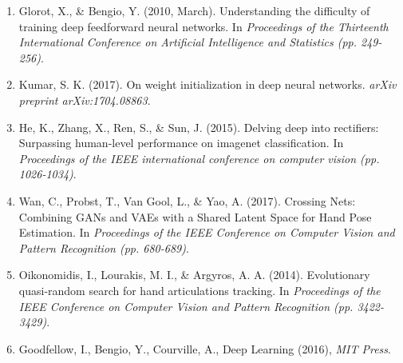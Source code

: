 \documentclass{article}
\begin{document}
\begin{enumerate}
\item Glorot, X., \& Bengio, Y. (2010, March). Understanding the difficulty of training deep feedforward neural networks. In \emph{ Proceedings of the Thirteenth International Conference on Artificial Intelligence and Statistics (pp. 249-256)}.
\item Kumar, S. K. (2017). On weight initialization in deep neural networks. \emph{arXiv preprint arXiv:1704.08863}.
\item He, K., Zhang, X., Ren, S., \& Sun, J. (2015). Delving deep into rectifiers: Surpassing human-level performance on imagenet classification. In \emph{Proceedings of the IEEE international conference on computer vision (pp. 1026-1034)}.
\item Wan, C., Probst, T., Van Gool, L., \& Yao, A. (2017). Crossing Nets: Combining GANs and VAEs with a Shared Latent Space for Hand Pose Estimation. In \emph{Proceedings of the IEEE Conference on Computer Vision and Pattern Recognition (pp. 680-689)}.
\item Oikonomidis, I., Lourakis, M. I., \& Argyros, A. A. (2014). Evolutionary quasi-random search for hand articulations tracking. In \emph{Proceedings of the IEEE Conference on Computer Vision and Pattern Recognition (pp. 3422-3429)}.
\item Goodfellow, I., Bengio, Y., Courville, A., Deep Learning (2016), \emph{MIT Press}.
\end{enumerate}
\end{document}
